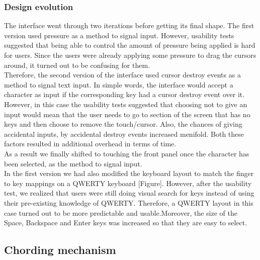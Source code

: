 \subsubsection{Design evolution}
The interface went through two iterations before getting its final shape. The first version used pressure as a method to signal input. However, usability tests suggested that being able to control the amount of pressure being applied is hard for users. Since the users were already applying some pressure to drag the cursors around, it turned out to be confusing for them. \\
Therefore, the second version of the interface used cursor destroy events as a method to signal text input. In simple words, the interface would accept a character as input if the corresponding key had a cursor destroy event over it. However, in this case the usability tests suggested that choosing not to give an input would mean that the user needs to go to section of the screen that has no keys and then choose to remove the touch/cursor. Also, the chances of giving accidental inputs, by accidental destroy events increased menifold. Both these factors resulted in additional overhead in terms of time. \\
As a result we finally shifted to touching the front panel once the character has been selected, as the method to signal input.\\
In the first version we had also modified the keyboard layout to match the finger to key mappings on a QWERTY keyboard [Figure]. However, after the usability test, we realized that users were still doing visual search for keys instead of using their pre-existing knowledge of QWERTY. Therefore, a QWERTY layout in this case turned out to be more predictable and usable.Moreover, the size of the Space, Backspace and Enter keys was increased so that they are easy to select.
\subsection{Chording mechanism}
